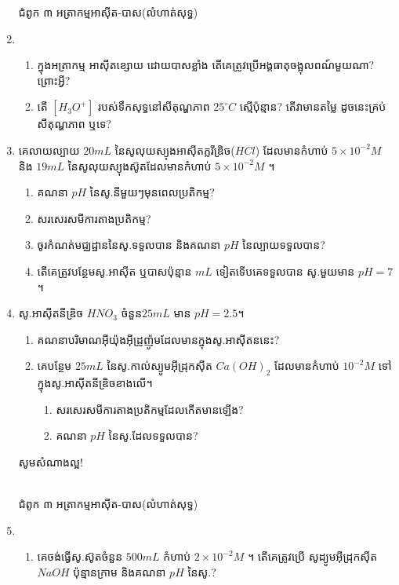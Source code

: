\documentclass[12pt, a5paper]{article}
\begin{document}
\begin{enumerate}[m]
\begin{center}
		ជំពូក ៣ អត្រាកម្មអាស៊ីត-បាស(លំហាត់សុទ្ធ)
	\end{center}
	\item \begin{enumerate}[k]
		\item ក្នុងអត្រាកម្ម អាស៊ីតខ្សោយ ដោយបាសខ្លាំង តើគេត្រូវប្រើអង្គធាតុចង្អុលពណ៍មួយណា? ព្រោះអ្វី?
		\item តើ $[H_3O^+]$ របស់ទឹកសុទ្ធនៅសីតុណ្ហភាព $25^\circ C$ ស្មើប៉ុន្មាន? តើវាមានតម្លៃ ដូចនេះគ្រប់សីតុណ្ហភាព ឬទេ?
	\end{enumerate}
	\item គេលាយល្បាយ $20mL$ នៃសូលុយស្យុងអាស៊ីតក្លរីឌ្រិច($HCl$) ដែលមានកំហាប់ $5\times10^{-2}M$ និង $19mL$ នៃសូលុយស្យុងស៊ូតដែលមានកំហាប់ $5\times10^{-2}M$ ។
	\begin{enumerate}[k]
		\item គណនា $pH$ នៃសូ.នីមួយៗមុនពេលប្រតិកម្ម?
		\item សរសេរសមីការតាងប្រតិកម្ម?
		\item ចូរកំណត់មជ្ឈដ្ឋាននៃសូ.ទទួលបាន និងគណនា $pH$ នៃល្បាយទទួលបាន?
		\item តើគេត្រូវបន្ថែមសូ.អាស៊ីត ឬបាសប៉ុន្មាន $mL$ ទៀតទើបគេទទួលបាន សូ.មួយមាន $pH=7$ ។
	\end{enumerate}
	\item សូ.អាស៊ីតនីឌ្រិច $HNO_3$ ចំនួន$25mL$ មាន $pH=2.5$។
	\begin{enumerate}[k]
		\item គណនាបរិមាណអ៊ីយ៉ុងអ៊ីដ្រូញ៉ូមដែលមានក្នុងសូ.អាស៊ីតននេះ?
		\item គេបន្ថែម $25mL$ នៃសូ.កាល់ស្យូមអ៊ីដ្រុកស៊ីត $Ca(OH)_2$ ដែលមានកំហាប់ $10^{-2}M$ ទៅក្នុងសូ.អាស៊ីតនីឌ្រិចខាងលើ។
		\begin{enumerate}[1]
			\item សរសេរសមីការតាងប្រតិកម្មដែលកើតមានឡើង?
			\item គណនា $pH$ នៃសូ.ដែលទទួលបាន?
		\end{enumerate}
	\end{enumerate}
	\begin{center}
		\sffamily\color{black}
		សូមសំណាងល្អ!
	\end{center}\newpage
	\begin{center}
		\sffamily\color{black}
		\\
		ជំពូក ៣ អត្រាកម្មអាស៊ីត-បាស(លំហាត់សុទ្ធ)
	\end{center}
	\item \begin{enumerate}[k]
		\item គេចង់ធ្វើសូ.ស៊ូតចំនួន $500mL$ កំហាប់ $2\times10^{-2}M$ ។ តើគេត្រូវប្រើ សូដ្យូមអ៊ីដ្រុកស៊ីត $NaOH$ ប៉ុន្មានក្រាម និងគណនា $pH$ នៃសូ.?

\end{enumerate}
\end{enumerate}
\end{document}
